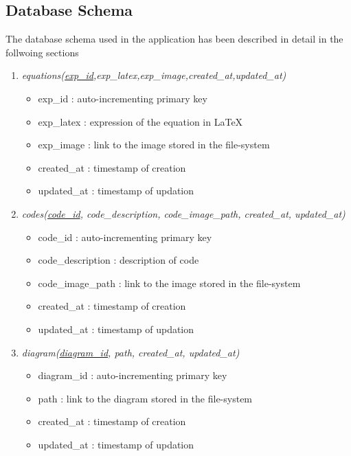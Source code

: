 \documentclass[a4paper,12pt,oneside]{book}
\begin{document}
    \subsection{Database Schema}
        The database schema used in the application has been described in detail in the follwoing sections
        
        \begin{enumerate}
            \item \textit{equations(\underline{exp\_id},exp\_latex,exp\_image,created\_at,updated\_at)}
                \begin{itemize}
                  \item exp\_id : auto-incrementing primary key
                  \item exp\_latex : expression of the equation in \LaTeX
                  \item exp\_image : link to the image stored in the file-system
                  \item created\_at : timestamp of creation
                  \item updated\_at : timestamp of updation 
                \end{itemize}
            
            \item \textit{codes(\underline{code\_id}, code\_description, code\_image\_path, created\_at, updated\_at)}
                \begin{itemize}
                  \item code\_id : auto-incrementing primary key
                  \item code\_description : description of code
                  \item code\_image\_path : link to the image stored in the file-system
                  \item created\_at : timestamp of creation
                  \item updated\_at : timestamp of updation 
                \end{itemize}
                
            \item \textit{diagram(\underline{diagram\_id}, path, created\_at, updated\_at)}
                \begin{itemize}
                  \item diagram\_id : auto-incrementing primary key
                  \item path : link to the diagram stored in the file-system
                  \item created\_at : timestamp of creation
                  \item updated\_at : timestamp of updation 
                \end{itemize}
                

\end{enumerate}
\end{document}
